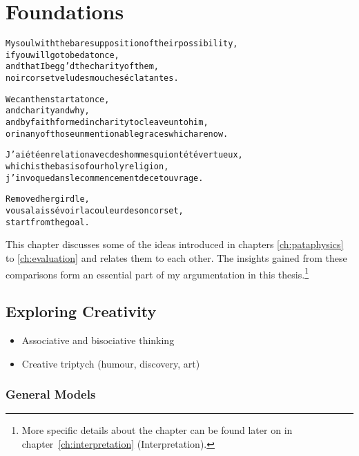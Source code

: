 
\chapter{Foundations}
\label{ch:foundations}

\startcontents[chapters]

\vfill

\begin{alltt}\sffamily
My soul with the bare supposition of their possibility,
if you will go to bed at once,
and that I begg'd the charity of them,
noir corset velu des mouches éclatantes.

We can then start at once,
and charity and why,
and by faith formed in charity to cleave unto him,
or in any of those unmentionable graces which are now.

J'ai été en relation avec des hommes qui ont été vertueux,
which is the basis of our holy religion,
j'invoque dans le commencement de cet ouvrage.

Removed her girdle,
vous a laissé voir la couleur de son corset,
start from the goal.
\end{alltt}

\newpage
\minicontents
\spirals

This chapter discusses some of the ideas introduced in chapters \ref{ch:pataphysics} to \ref{ch:evaluation} and relates them to each other. The insights gained from these comparisons form an essential part of my argumentation in this thesis.\footnote{More specific details about the  chapter can be found later on in chapter~\ref{ch:interpretation} (Interpretation).}


\section{Exploring Creativity}

\begin{shaded}
  \begin{itemize}
    \item Associative and bisociative thinking
    \item Creative triptych (humour, discovery, art)
  \end{itemize}
\end{shaded}


\subsection{General Models}

